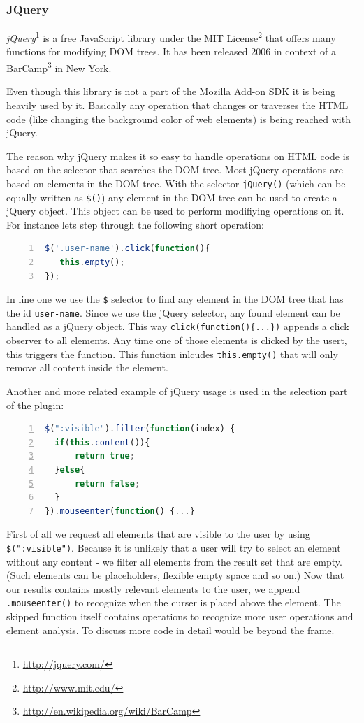 \subsubsection*{JQuery}
\emph{jQuery}\footnote{\url{http://jquery.com/}} is a free JavaScript library under the MIT License\footnote{\url{http://www.mit.edu/}} that offers many functions for modifying DOM trees. It has been released 2006 in context of a BarCamp\footnote{\url{http://en.wikipedia.org/wiki/BarCamp}} in New York.

Even though this library is not a part of the Mozilla Add-on SDK it is being heavily used by it. Basically any operation that changes or traverses the HTML code (like changing the background color of web elements) is being reached with jQuery.

The reason why jQuery makes it so easy to handle operations on HTML code is based on the selector that searches the DOM tree. Most jQuery operations are based on elements in the DOM tree. With the selector \verb+jQuery()+ (which can be equally written as \verb+$()+) any element in the DOM tree can be used to create a jQuery object. This object can be used to perform modifiying operations on it. For instance lets step through the following short operation:
\begin{lstlisting}[language=JavaScript, numbers=left]
$('.user-name').click(function(){
   this.empty();
});
\end{lstlisting}

In line one we use the \verb+$+ selector to find any element in the DOM tree that has the id \verb+user-name+. Since we use the jQuery selector, any found element can be handled as a jQuery object. This way \verb+click(function(){...})+ appends a click observer to all elements. Any time one of those elements is clicked by the usert, this triggers the function. This function inlcudes \verb+this.empty()+ that will only remove all content inside the element. 

Another and more related example of jQuery usage is used in the selection part of the plugin:
\begin{lstlisting}[language=JavaScript, numbers=left]
$(":visible").filter(function(index) {
  if(this.content()){
      return true;
  }else{
      return false;
  }
}).mouseenter(function() {...}
\end{lstlisting} 

First of all we request all elements that are visible to the user by using \verb+$(":visible")+. Because it is unlikely that a user will try to select an element without any content - we filter all elements from the result set that are empty. (Such elements can be placeholders, flexible empty space and so on.) Now that our results contains mostly relevant elements to the user, we append \verb+.mouseenter()+ to recognize when the curser is placed above the element. The skipped function itself contains operations to recognize more user operations and element analysis. To discuss more code in detail would be beyond the frame. 


